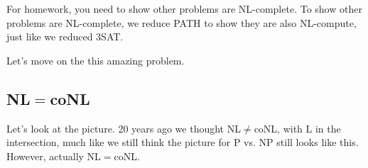 

For homework, you need to show other problems are NL-complete.  To show other problems are NL-complete, we reduce
PATH to show they are also NL-compute, just like we reduced 3SAT.


Let's move on the this amazing problem.
\subsection{NL$=$coNL}
Let's look at the picture. 20 years ago we thought NL$\ne$coNL, with L in the intersection, much like we still think the picture for P vs. NP still looks like this. However, actually NL$=$coNL.

